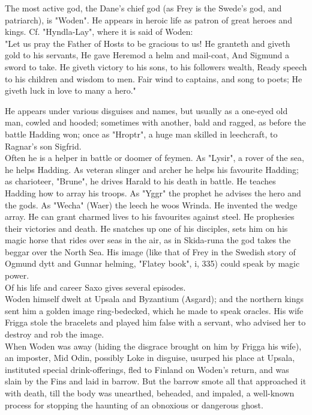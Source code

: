 \documentclass[10pt,a4paper]{report}
\begin{document}
The most active god, the Dane's chief god (as Frey is the Swede's god, and patriarch), is "Woden". He appears in heroic life as patron of great heroes and kings. Cf. "Hyndla-Lay", where it is said of Woden:\\

\indent  "Let us pray the Father of Hosts to be gracious to us!
\indent  He granteth and giveth gold to his servants,
\indent  He gave Heremod a helm and mail-coat,
\indent  And Sigmund a sword to take.
\indent  He giveth victory to his sons, to his followers wealth,
\indent  Ready speech to his children and wisdom to men.
\indent  Fair wind to captains, and song to poets;
\indent  He giveth luck in love to many a hero."

He appears under various disguises and names, but usually as a one-eyed old man, cowled and hooded; sometimes with another, bald and ragged, as before the battle Hadding won; once as "Hroptr", a huge man skilled in leechcraft, to Ragnar's son Sigfrid.\\

Often he is a helper in battle or doomer of feymen. As "Lysir", a rover of the sea, he helps Hadding. As veteran slinger and archer he helps his favourite Hadding; as charioteer, "Brune", he drives Harald to his death in battle. He teaches Hadding how to array his troops. As "Yggr" the prophet he advises the hero and the gods. As "Wecha" (Waer) the leech he woos Wrinda. He invented the wedge array. He can grant charmed lives to his favourites against steel. He prophesies their victories and death. He snatches up one of his disciples, sets him on his magic horse that rides over seas in the air, as in Skida-runa the god takes the beggar over the North Sea. His image (like that of Frey in the Swedish story of Ogmund dytt and Gunnar helming, "Flatey book", i, 335) could speak by magic power.\\

Of his life and career Saxo gives several episodes.\\

Woden himself dwelt at Upsala and Byzantium (Asgard); and the northern kings sent him a golden image ring-bedecked, which he made to speak oracles. His wife Frigga stole the bracelets and played him false with a servant, who advised her to destroy and rob the image.\\

When Woden was away (hiding the disgrace brought on him by Frigga his wife), an imposter, Mid Odin, possibly Loke in disguise, usurped his place at Upsala, instituted special drink-offerings, fled to Finland on Woden's return, and was slain by the Fins and laid in barrow. But the barrow smote all that approached it with death, till the body was unearthed, beheaded, and impaled, a well-known process for stopping the haunting of an obnoxious or dangerous ghost.\\
\end{document}
